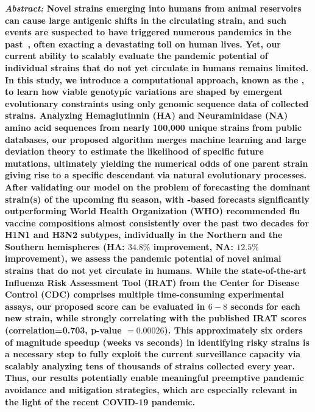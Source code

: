\documentclass[onecolumn, compsoc,10pt]{IEEEtran}
\begin{document}
  

\maketitle

{\bf \sffamily \fontsize{10}{12}\selectfont \noindent   
  {\normalfont \itshape Abstract:} Novel \infl  strains emerging into humans from animal reservoirs can cause large antigenic shifts in the circulating strain, and such events are suspected to have triggered numerous  pandemics in the past~\cite{shao2017evolution,mills2004transmissibility,reid2003origin,landolt2007up}, often exacting a devastating toll on human lives. Yet, our current ability to  scalably  evaluate the pandemic potential of   individual strains that do not yet circulate in humans remains limited. In this study, we introduce a computational approach, known as the \enet,  to learn how viable genotypic variations are shaped by  emergent evolutionary constraints using only genomic sequence data of collected strains.    Analyzing    Hemaglutinnin (HA) and Neuraminidase (NA) amino acid sequences from nearly 100,000 unique \infl  strains from public  databases, our proposed algorithm merges machine learning and large deviation theory to  estimate the likelihood of  specific future  mutations, ultimately  yielding the  numerical odds of one parent strain giving rise to a specific descendant via natural evolutionary processes. After validating our model on the problem of forecasting the dominant strain(s) of the upcoming flu season, with \enet-based forecasts significantly outperforming World Health Organization (WHO) recommended flu vaccine compositions almost consistently over the past two decades for  H1N1 and H3N2 subtypes, individually in the Northern and the Southern hemispheres (HA: $34.8\% $ improvement, NA: $12.5\%$ improvement), we assess  the pandemic potential  of novel animal  strains that do not yet circulate in humans. While the state-of-the-art  Influenza Risk Assessment Tool (IRAT) from the Center for Disease Control (CDC) comprises multiple time-consuming experimental assays, our proposed \erisk score can be evaluated in $6-8$ seconds for each new strain, while strongly correlating with the published IRAT scores (correlation=0.703, p-value $= 0.00026$). This approximately six orders of magnitude speedup (weeks vs seconds) in  identifying risky strains is a necessary step to fully exploit the  current surveillance capacity via scalably analyzing tens of thousands of strains collected every year. Thus, our results potentially  enable  meaningful preemptive pandemic avoidance and mitigation strategies, which are especially relevant in the light of the recent COVID-19 pandemic.
}
  
\end{document}

